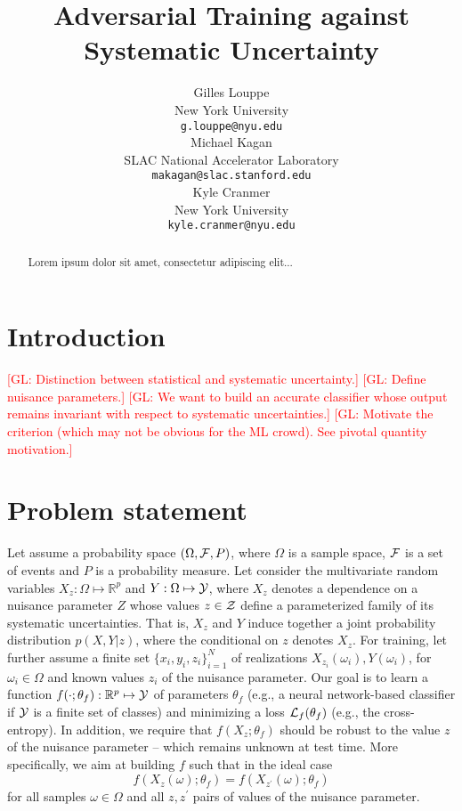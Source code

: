 \documentclass{article}
\title{Adversarial Training against Systematic Uncertainty}
\author{
  Gilles Louppe \\
  New York University\\
  \texttt{g.louppe@nyu.edu} \\
  \And
  Michael Kagan\\
  SLAC National Accelerator Laboratory\\
  \texttt{makagan@slac.stanford.edu}\\
  \And
  Kyle Cranmer \\
  New York University\\
  \texttt{kyle.cranmer@nyu.edu}
}
\newcommand{\glnote}[1]{\textcolor{red}{[GL: #1]}}
\theoremstyle{plain}
\begin{document}
\maketitle


\begin{abstract}

Lorem ipsum dolor sit amet, consectetur adipiscing elit...

\end{abstract}



\section{Introduction}

\glnote{Distinction between statistical and systematic uncertainty.}
\glnote{Define nuisance parameters.}
\glnote{We want to build an accurate classifier whose output remains invariant with
respect to systematic uncertainties.}
\glnote{Motivate the criterion (which may not be obvious for the ML crowd). See pivotal quantity motivation.}



\section{Problem statement}
\label{sec:problem}

Let assume a probability space $(\Omega, {\cal F}, P)$, where $\Omega$ is a
sample space, ${\cal F}$ is a set of events and $P$ is a probability measure.
Let consider the multivariate random variables $X_z: \Omega \mapsto
\mathbb{R}^p$ and $Y: \Omega \mapsto {\cal Y}$, where $X_z$ denotes a dependence on a
nuisance parameter $Z$ whose values $z \in {\cal Z}$  define a
parameterized family of its systematic uncertainties. That is, $X_z$ and
$Y$ induce together a joint probability distribution $p(X,Y|z)$, where the
conditional on $z$ denotes $X_z$. For training, let further assume a
finite set $\{ x_i, y_i, z_i \}_{i=1}^N$ of realizations
$X_{z_i}(\omega_i), Y(\omega_i)$, for $\omega_i \in \Omega$ and known
values $z_i$ of the nuisance parameter. Our goal is to learn a function
$f(\cdot;\theta_f) : \mathbb{R}^p \mapsto {\cal Y}$ of parameters $\theta_f$
(e.g., a neural network-based classifier if ${\cal Y}$ is a finite set of
classes) and minimizing  a loss ${\cal L}_f(\theta_f)$ (e.g., the cross-entropy). In addition, we require
that $f(X_z ; \theta_f)$ should be robust to the value $z$ of the nuisance parameter  --
which remains unknown at test time. More specifically, we aim at building $f$
such that in the ideal case
\begin{equation}\label{eqn:criterion-true}
f(X_{z}(\omega) ; \theta_f) = f(X_{z^\prime}(\omega) ; \theta_f)
\end{equation} for all
samples $\omega \in \Omega$ and all $z, z^\prime$ pairs of values of the
nuisance parameter.
\end{document}
